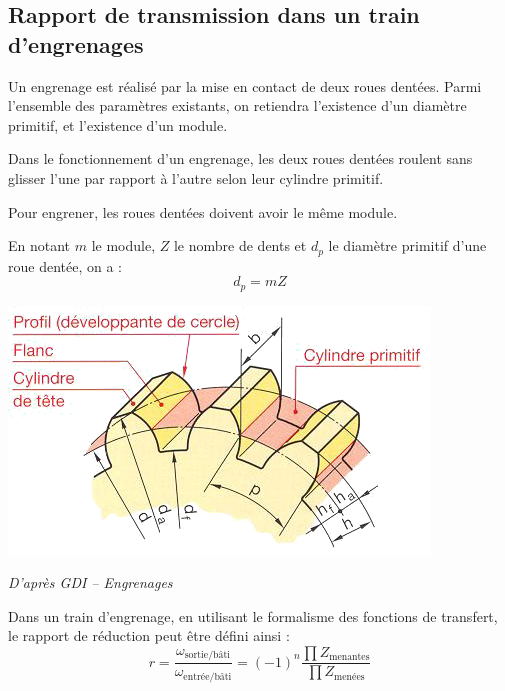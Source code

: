 \documentclass[10pt,oneside]{article}
\begin{document}
\subsection{Rapport de transmission dans un train d'engrenages}
\begin{defi}
\begin{minipage}[c]{.55\linewidth}
Un engrenage est réalisé par la mise en contact de deux roues dentées. Parmi l'ensemble des paramètres existants, on retiendra l'existence d'un diamètre primitif, et l'existence d'un module.

Dans le fonctionnement d'un engrenage, les deux roues dentées roulent sans glisser l'une par rapport à l'autre selon leur cylindre primitif. 

Pour engrener, les roues dentées doivent avoir le même module.

En notant $m$ le module, $Z$ le nombre de dents et $d_p$ le diamètre primitif d'une roue dentée, on a :
$$
d_p = mZ
$$
\end{minipage} \hfill
\begin{minipage}[c]{.4\linewidth}
\begin{center}
\includegraphics[width=.95\textwidth]{png/gdi}

\textit{D'après GDI -- Engrenages \cite{gdi}}
\end{center}
\end{minipage}
\end{defi}

\begin{resultat}
Dans un train d'engrenage, en utilisant le formalisme des fonctions de transfert, le rapport de réduction peut être défini ainsi : 
$$
r = \dfrac{\omega_{\text{sortie/bâti}}}{\omega_{\text{entrée/bâti}}} =  \left(-1\right)^n\dfrac{\prod Z_{\text{menantes}}}{\prod Z_{\text{menées}}}
$$
\end{resultat}
\end{document}

